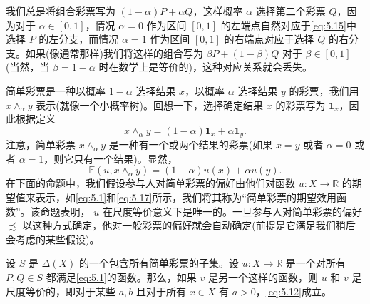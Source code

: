 我们总是将组合彩票写为 \(\left( {1 - \alpha }\right) P + {\alpha Q}\)，这样概率 \(\alpha\) 选择第二个彩票 \(Q\)，因为对于 \(\alpha  \in  \left\lbrack  {0,1}\right\rbrack\)，情况 \(\alpha  = 0\) 作为区间 \(\left\lbrack  {0,1}\right\rbrack\) 的左端点自然对应于\eqref{eq:5.15}中选择 \(P\) 的左分支，而情况 \(\alpha  = 1\) 作为区间 \(\left\lbrack  {0,1}\right\rbrack\) 的右端点对应于选择 \(Q\) 的右分支。如果(像通常那样)我们将这样的组合写为 \({\beta P} + \left( {1 - \beta }\right) Q\) 对于 \(\beta  \in  \left\lbrack  {0,1}\right\rbrack\) (当然，当 \(\beta  = 1 - \alpha\) 时在数学上是等价的)，这种对应关系就会丢失。

简单彩票是一种以概率 \(1 - \alpha\) 选择结果 \(x\)，以概率 \(\alpha\) 选择结果 \(y\) 的彩票，我们用 \(x{ \land  }_{\alpha }y\) 表示(就像一个小概率树)。回想一下，选择确定结果 \(x\) 的彩票写为 \({\mathbf{1}}_{x}\)，因此根据定义
\begin{equation}
\label{eq:5.16}
x{ \land  }_{\alpha }y = \left( {1 - \alpha }\right) {\mathbf{1}}_{x} + \alpha {\mathbf{1}}_{y}.
\end{equation}
注意，简单彩票 \(x{ \land  }_{\alpha }y\) 是一种有一个或两个结果的彩票(如果 \(x = y\) 或者 \(\alpha  = 0\) 或者 \(\alpha  = 1\)，则它只有一个结果)。显然，
\begin{equation}
\label{eq:5.17}
\mathbb{E}\left( {u,x{ \land  }_{\alpha }y}\right)  = \left( {1 - \alpha }\right) u\left( x\right)  + {\alpha u}\left( y\right) .
\end{equation}
在下面的命题中，我们假设参与人对简单彩票的偏好由他们对函数 \(u : X \rightarrow  \mathbb{R}\) 的期望值来表示，如\eqref{eq:5.1}和\eqref{eq:5.17}所示，我们将其称为“简单彩票的期望效用函数”。该命题表明， \(u\) 在尺度等价意义下是唯一的。一旦参与人对简单彩票的偏好 \(\precsim\) 以这种方式确定，他对一般彩票的偏好就会自动确定(前提是它满足我们稍后会考虑的某些假设)。

\begin{proposition}\label{prop:5.2}设 \(S\) 是 \(\Delta \left( X\right)\) 的一个包含所有简单彩票的子集。设 \(u : X \rightarrow  \mathbb{R}\) 是一个对所有 \(P,Q \in  S\) 都满足\eqref{eq:5.1}的函数。那么，如果 \(v\) 是另一个这样的函数，则 \(u\) 和 \(v\) 是尺度等价的，即对于某些 \(a,b\) 且对于所有 \(x \in  X\) 有 \(a > 0\)，\eqref{eq:5.12}成立。
\end{proposition}

